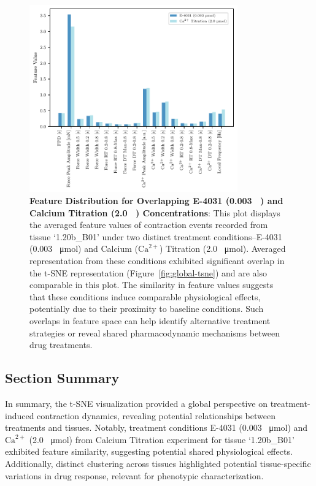 \documentclass{report}
\begin{document}
       \begin{figure}[H]
            \centering
            \includegraphics[width=0.8\textwidth, keepaspectratio]{plots/chapter_4/drug_tsne_overlapping_concentration.pdf}
            \caption[Feature Distribution for Overlapping E-4031 (0.003 \SI{}{\umol}) and Calcium Titration (2.0 \SI{}{\umol}) Concentrations]{
                \textbf{Feature Distribution for Overlapping E-4031 (0.003 \SI{}{\textbf{\umol}}) and Calcium Titration (2.0 \SI{}{\textbf{\umol}}) Concentrations}:  
                This plot displays the averaged feature values of contraction events recorded from tissue `1.20b\_B01' under two distinct treatment conditions--E-4031 (0.003 \SI{}{\umol}) and Calcium ($\text{Ca}^{2+}$) Titration (2.0 \SI{}{\umol}). Averaged representation from these conditions exhibited significant overlap in the t-SNE representation (Figure~\ref{fig:global-tsne}) and are also comparable in this plot. The similarity in feature values suggests that these conditions induce comparable physiological effects, potentially due to their proximity to baseline conditions. Such overlaps in feature space can help identify alternative treatment strategies or reveal shared pharmacodynamic mechanisms between drug treatments.}
            \label{fig:overlapping}
        \end{figure}

        \subsection{Section Summary}
        In summary, the t-SNE visualization provided a global perspective on treatment-induced contraction dynamics, revealing potential relationships between treatments and tissues. Notably, treatment conditions E-4031 (0.003 \SI{}{\umol}) and $\text{Ca}^{2+}$ (2.0 \SI{}{\umol}) from Calcium Titration experiment for tissue `1.20b\_B01' exhibited feature similarity, suggesting potential shared physiological effects. Additionally, distinct clustering across tissues highlighted potential tissue-specific variations in drug response, relevant for phenotypic characterization.
\end{document}
